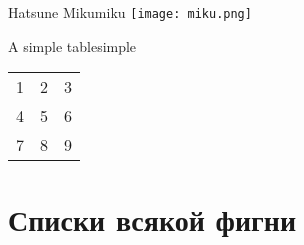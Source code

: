 \documentclass{diploma}
\begin{document}
\begin{gostimage}{Hatsune Miku}{miku}
	\texttt{[image: miku.png]}
\end{gostimage}

\begin{gosttable}{A simple table}{simple}
	\begin{tabular}{| l c r |}
		\hline
		1 & 2 & 3 \\
		4 & 5 & 6 \\
		7 & 8 & 9 \\
		\hline
	\end{tabular}
\end{gosttable}

\section{Списки всякой фигни}

\listoffigures
\listoftables
\end{document}
